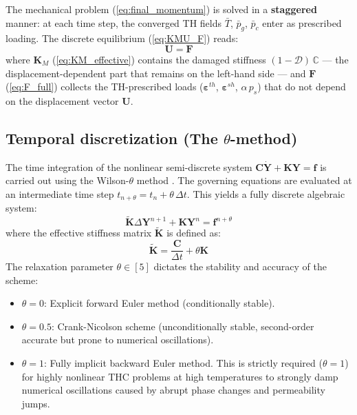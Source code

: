 The mechanical problem (\cref{eq:final_momentum}) is solved in a \textbf{staggered} manner: at each time step, the converged TH fields $\bar{T}$, $\bar{p}_g$, $\bar{p}_c$ enter as prescribed loading. The discrete equilibrium (\cref{eq:KMU_F}) reads:
\begin{equation}
    [\mathbf{K}_M]{\mathbf{U}} = {\mathbf{F}}
    \label{eq:mech_matrix}
\end{equation}
where $\mathbf{K}_M$ (\cref{eq:KM_effective}) contains the damaged stiffness $(1-\mathcal{D})\,\mathbb{C}$ --- the displacement-dependent part that remains on the left-hand side --- and $\mathbf{F}$ (\cref{eq:F_full}) collects the TH-prescribed loads ($\boldsymbol{\varepsilon}^{th}$, $\boldsymbol{\varepsilon}^{sh}$, $\alpha\,p_s$) that do not depend on the displacement vector $\mathbf{U}$.

\subsection{Temporal discretization (The $\theta$-method)} \label{sec:temporal_discret}
The time integration of the nonlinear semi-discrete system $\mathbf{C} \dot{\mathbf{Y}} + \mathbf{K} \mathbf{Y} = \mathbf{f}$ is carried out using the Wilson-$\theta$ method \cite{lewis1998}. The governing equations are evaluated at an intermediate time step $t_{n+\theta} = t_n + \theta\,\Delta t$. This yields a fully discrete algebraic system:
\begin{equation}
    \tilde{\mathbf{K}} \Delta\mathbf{Y}^{n+1} + \mathbf{K} \mathbf{Y}^{n} = \mathbf{f}^{n+\theta}
\end{equation}
where the effective stiffness matrix $\tilde{\mathbf{K}}$ is defined as:
\begin{equation}
    \tilde{\mathbf{K}} = \frac{\mathbf{C}}{\Delta t} + \theta \mathbf{K}
\end{equation}
The relaxation parameter $\theta \in [5]$ dictates the stability and accuracy of the scheme:
\begin{itemize}
    \item $\theta = 0$: Explicit forward Euler method (conditionally stable).
    \item $\theta = 0.5$: Crank-Nicolson scheme (unconditionally stable, second-order accurate but prone to numerical oscillations).
    \item $\theta = 1$: Fully implicit backward Euler method. This is strictly required ($\theta = 1$) for highly nonlinear THC problems at high temperatures to strongly damp numerical oscillations caused by abrupt phase changes and permeability jumps.
\end{itemize}